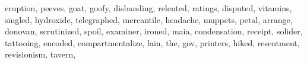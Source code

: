 \documentclass[
  12pt,
]{book}
\newenvironment{Shaded}{\begin{snugshade}}{\end{snugshade}}
\newcommand{\NormalTok}[1]{#1}
\newcommand{\StringTok}[1]{\textcolor[rgb]{0.31,0.60,0.02}{#1}}
\begin{document}
\begin{Shaded}
\begin{Highlighting}[]
                \StringTok{\textquotesingle{}eruption\textquotesingle{}}\NormalTok{, }\StringTok{\textquotesingle{}peeves\textquotesingle{}}\NormalTok{, }\StringTok{\textquotesingle{}goat\textquotesingle{}}\NormalTok{, }\StringTok{\textquotesingle{}goofy\textquotesingle{}}\NormalTok{, }\StringTok{\textquotesingle{}disbanding\textquotesingle{}}\NormalTok{, }
                \StringTok{\textquotesingle{}relented\textquotesingle{}}\NormalTok{, }\StringTok{\textquotesingle{}ratings\textquotesingle{}}\NormalTok{, }\StringTok{\textquotesingle{}disputed\textquotesingle{}}\NormalTok{, }\StringTok{\textquotesingle{}vitamins\textquotesingle{}}\NormalTok{, }\StringTok{\textquotesingle{}singled\textquotesingle{}}\NormalTok{,}
                \StringTok{\textquotesingle{}hydroxide\textquotesingle{}}\NormalTok{, }\StringTok{\textquotesingle{}telegraphed\textquotesingle{}}\NormalTok{, }\StringTok{\textquotesingle{}mercantile\textquotesingle{}}\NormalTok{, }\StringTok{\textquotesingle{}headache\textquotesingle{}}\NormalTok{, }
                \StringTok{\textquotesingle{}muppets\textquotesingle{}}\NormalTok{, }\StringTok{\textquotesingle{}petal\textquotesingle{}}\NormalTok{, }\StringTok{\textquotesingle{}arrange\textquotesingle{}}\NormalTok{, }\StringTok{\textquotesingle{}donovan\textquotesingle{}}\NormalTok{, }\StringTok{\textquotesingle{}scrutinized\textquotesingle{}}\NormalTok{,}
                \StringTok{\textquotesingle{}spoil\textquotesingle{}}\NormalTok{, }\StringTok{\textquotesingle{}examiner\textquotesingle{}}\NormalTok{, }\StringTok{\textquotesingle{}ironed\textquotesingle{}}\NormalTok{, }\StringTok{\textquotesingle{}maia\textquotesingle{}}\NormalTok{, }\StringTok{\textquotesingle{}condensation\textquotesingle{}}\NormalTok{,}
                \StringTok{\textquotesingle{}receipt\textquotesingle{}}\NormalTok{, }\StringTok{\textquotesingle{}solider\textquotesingle{}}\NormalTok{, }\StringTok{\textquotesingle{}tattooing\textquotesingle{}}\NormalTok{, }\StringTok{\textquotesingle{}encoded\textquotesingle{}}\NormalTok{,}
                \StringTok{\textquotesingle{}compartmentalize\textquotesingle{}}\NormalTok{, }\StringTok{\textquotesingle{}lain\textquotesingle{}}\NormalTok{, }\StringTok{\textquotesingle{}the\textquotesingle{}}\NormalTok{, }\StringTok{\textquotesingle{}gov\textquotesingle{}}\NormalTok{,}
                \StringTok{\textquotesingle{}printers\textquotesingle{}}\NormalTok{, }\StringTok{\textquotesingle{}hiked\textquotesingle{}}\NormalTok{, }\StringTok{\textquotesingle{}resentment\textquotesingle{}}\NormalTok{, }\StringTok{\textquotesingle{}revisionism\textquotesingle{}}\NormalTok{, }\StringTok{\textquotesingle{}tavern\textquotesingle{}}\NormalTok{,}

\end{Highlighting}
\end{Shaded}
\end{document}
